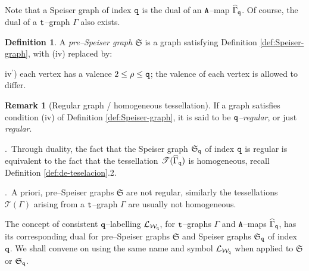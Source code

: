 \documentclass[final,3p,times]{elsarticle}
\theoremstyle{definition}
\newtheorem{definition}[theorem]{Definition}
\newtheorem{remark}[theorem]{Remark}
\begin{document}
Note that a Speiser graph of index $\tt q$ is the dual of 
an $\tt A$--map $\widehat{\Gamma}_{\tt q}$.
Of course, the dual of a $\tt t$--graph $\Gamma$ also exists.

\begin{definition}
\label{def:pre-Speiser-graph}
A \emph{pre--Speiser graph $\mathfrak{S}$} is a graph satisfying Definition \ref{def:Speiser-graph}, 
with (iv) replaced by:

\smallskip
\noindent
iv$^\prime$) each vertex has a valence $2\leq\rho\leq {\tt q}$; the valence of each vertex 
is allowed to differ.
\end{definition}


\begin{remark}[Regular graph / homogeneous tessellation]
\label{rem:regular-description}
If a graph satisfies condition (iv) of Definition 
\ref{def:Speiser-graph}, it is said to be 
\emph{$\tt q$--regular}, or just \emph{regular}.

.\ Through duality, the fact that the Speiser graph 
$\mathfrak{S}_{\tt q}$ 
of index $\tt q$ is regular is equivalent  to the fact that the tessellation 
$\mathscr{T}(\widehat{\Gamma}_{\tt q})$ is 
homogeneous, recall Definition \ref{def:de-teselacion}.2.

.\ 
A priori,  pre--Speiser graphs $\mathfrak{S}$ are not regular, similarly
the tessellations $\mathscr{T}(\Gamma)$ arising from a $\tt t$--graph $\Gamma$
are usually not homogeneous.
\end{remark}


The concept of consistent $\tt q$--labelling $\mathcal{L}_{\mathcal{W}_{\tt q}}$, for
$\tt t$--graphs $\Gamma$ and $\tt A$--maps $\widehat{\Gamma}_{\tt q}$, 
has its corresponding dual for pre--Speiser graphs $\mathfrak{S}$ and 
Speiser graphs $\mathfrak{S}_{\tt q}$ of index $\tt q$. 
We shall convene on using the same name and symbol $\mathcal{L}_{\mathcal{W}_{\tt q}}$
when applied to $\mathfrak{S}$ or $\mathfrak{S}_{\tt q}$.
\end{document}
